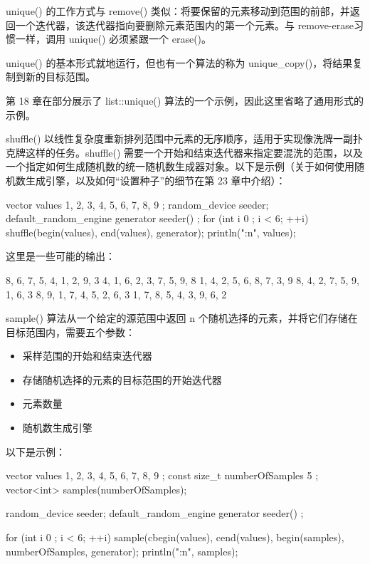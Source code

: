 unique() 的工作方式与 remove() 类似：将要保留的元素移动到范围的前部，并返回一个迭代器，该迭代器指向要删除元素范围内的第一个元素。与 remove-erase习惯一样，调用 unique() 必须紧跟一个 erase()。

unique() 的基本形式就地运行，但也有一个算法的称为 unique\_copy()，将结果复制到新的目标范围。

第 18 章在部分展示了 list::unique() 算法的一个示例，因此这里省略了通用形式的示例。


shuffle() 以线性复杂度重新排列范围中元素的无序顺序，适用于实现像洗牌一副扑克牌这样的任务。shuffle() 需要一个开始和结束迭代器来指定要混洗的范围，以及一个指定如何生成随机数的统一随机数生成器对象。以下是示例（关于如何使用随机数生成引擎，以及如何“设置种子”的细节在第 23 章中介绍）：

\begin{cpp}
vector values { 1, 2, 3, 4, 5, 6, 7, 8, 9 };
random_device seeder;
default_random_engine generator { seeder() };
for (int i { 0 }; i < 6; ++i) {
    shuffle(begin(values), end(values), generator);
    println("{:n}", values);
}
\end{cpp}

这里是一些可能的输出：

\begin{shell}
8, 6, 7, 5, 4, 1, 2, 9, 3
4, 1, 6, 2, 3, 7, 5, 9, 8
1, 4, 2, 5, 6, 8, 7, 3, 9
8, 4, 2, 7, 5, 9, 1, 6, 3
8, 9, 1, 7, 4, 5, 2, 6, 3
1, 7, 8, 5, 4, 3, 9, 6, 2
\end{shell}



sample() 算法从一个给定的源范围中返回 n 个随机选择的元素，并将它们存储在目标范围内，需要五个参数：

\begin{itemize}
\item
采样范围的开始和结束迭代器

\item
存储随机选择的元素的目标范围的开始迭代器

\item
元素数量

\item
随机数生成引擎
\end{itemize}

以下是示例：

\begin{cpp}
vector values { 1, 2, 3, 4, 5, 6, 7, 8, 9 };
const size_t numberOfSamples { 5 };
vector<int> samples(numberOfSamples);

random_device seeder;
default_random_engine generator { seeder() };

for (int i { 0 }; i < 6; ++i) {
    sample(cbegin(values), cend(values), begin(samples),
        numberOfSamples, generator);
    println("{:n}", samples);
}
\end{cpp}

